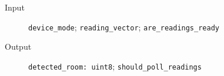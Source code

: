 \begin{flushleft}
  \begin{description}
    \item [Input]
      \verb#device_mode#;
      \verb#reading_vector#;
      \verb#are_readings_ready#
    \item [Output]
      \verb#detected_room: uint8#;
      \verb#should_poll_readings#
  \end{description}
\end{flushleft}
